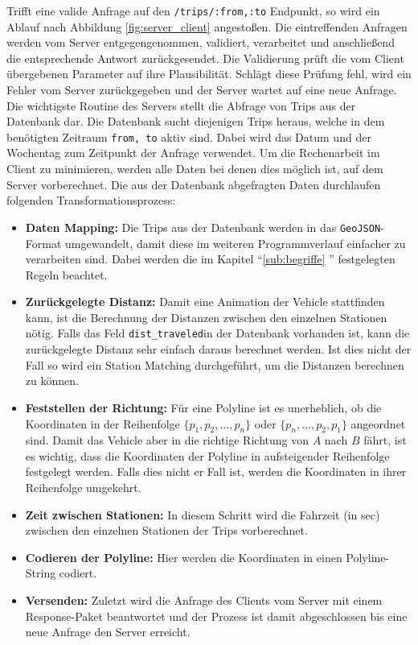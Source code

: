   Trifft eine valide Anfrage auf den \texttt{/trips/:from,:to} Endpunkt, so wird ein Ablauf nach Abbildung \ref{fig:server_client} angestoßen.
  Die eintreffenden Anfragen werden vom Server entgegengenommen, validiert, verarbeitet und anschließend die entsprechende Antwort zurückgesendet. Die Validierung prüft die vom Client übergebenen Parameter auf ihre Plausibilität. Schlägt diese Prüfung fehl, wird ein Fehler vom Server zurückgegeben und der Server wartet auf eine neue Anfrage. Die wichtigste Routine des Servers stellt die Abfrage von Trips aus der Datenbank dar. Die Datenbank sucht diejenigen Trips heraus, welche in dem benötigten Zeitraum \texttt{from, to} aktiv sind. Dabei wird das Datum und der Wochentag zum Zeitpunkt der Anfrage verwendet. Um die Rechenarbeit im Client zu minimieren, werden alle Daten bei denen dies möglich ist, auf dem Server vorberechnet. Die aus der Datenbank abgefragten Daten durchlaufen folgenden Transformationsprozess:

  \begin{itemize}
    \item \textbf{Daten Mapping:} Die Trips aus der Datenbank werden in das \texttt{GeoJSON}-Format umgewandelt, damit diese im weiteren Programmverlauf einfacher zu verarbeiten sind. Dabei werden die im Kapitel "`\ref{sub:begriffe} "' festgelegten Regeln beachtet.

    \item \textbf{Zurückgelegte Distanz:} Damit eine Animation der Vehicle stattfinden kann, ist die Berechnung der Distanzen zwischen den einzelnen Stationen nötig. Falls das Feld \texttt{dist\_traveled}\footnotemark in der Datenbank vorhanden ist, kann die zurückgelegte Distanz sehr einfach daraus berechnet werden. Ist dies nicht der Fall so wird ein Station Matching durchgeführt, um die Distanzen berechnen zu können.

    \item \textbf{Feststellen der Richtung:} Für eine Polyline ist es unerheblich, ob die Koordinaten in der Reihenfolge $\{ p_1, p_2, \dotsc, p_n \}$ oder $\{ p_n, \dotsc, p_2, p_1 \}$ angeordnet sind. Damit das Vehicle aber in die richtige Richtung von $A$ nach $B$ fährt, ist es wichtig, dass die Koordinaten der Polyline in aufsteigender Reihenfolge festgelegt werden. Falls dies nicht er Fall ist, werden die Koordinaten in ihrer Reihenfolge umgekehrt.

    \item \textbf{Zeit zwischen Stationen:} In diesem Schritt wird die Fahrzeit (in sec) zwischen den einzelnen Stationen der Trips vorberechnet.

    \item \textbf{Codieren der Polyline:} Hier werden die Koordinaten in einen Polyline-String codiert.

    \item \textbf{Versenden:} Zuletzt wird die Anfrage des Clients vom Server mit einem Response-Paket beantwortet und der Prozess ist damit abgeschlossen bis eine neue Anfrage den Server erreicht.
  \end{itemize}

